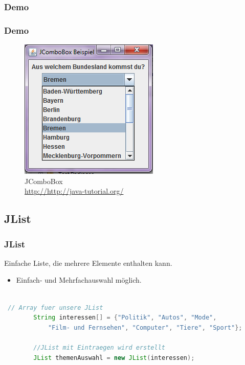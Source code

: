 \documentclass[xcolor=dvipsnames]{beamer}
\begin{document}
\subsubsection{Demo}
\begin{frame}
  \frametitle{Demo}
	\begin{figure}
		\includegraphics[scale=0.8]{images/jcombobox.PNG}
		\caption{JComboBox \\ \tiny{\textcolor{gray}{\url{http://http://java-tutorial.org/}}}}
		\end{figure}
\end{frame}


\subsection{JList}
\begin{frame}  %
  \frametitle{JList} %
  \begin{block}{Einfache Liste, die mehrere Elemente enthalten kann. }
	  \begin{itemize}
		\item Einfach- und Mehrfachauswahl möglich.
	  \end{itemize}
  \end{block}

\begin{lstlisting}[language=java,basicstyle=\scriptsize\ttfamily]

 // Array fuer unsere JList
        String interessen[] = {"Politik", "Autos", "Mode", 
            "Film- und Fernsehen", "Computer", "Tiere", "Sport"};
 
        //JList mit Eintraegen wird erstellt
        JList themenAuswahl = new JList(interessen);

\end{lstlisting}

\end{frame}
\end{document}
